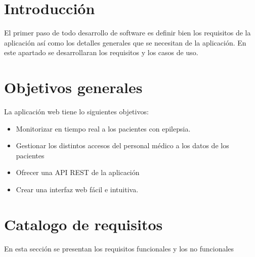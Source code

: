
\section{Introducción}

El primer paso de todo desarrollo de software es definir bien los requisitos de la aplicación así como los detalles generales que se necesitan de la aplicación. En este apartado se desarrollaran los requisitos y los casos de uso.

\section{Objetivos generales}

La aplicación web tiene lo siguientes objetivos:
\begin{itemize}
	\tightlist
	\item
	Monitorizar en tiempo real a los pacientes con epilepsia.
	\item 
	Gestionar los distintos accesos del personal médico a los datos de los pacientes
	\item 
	Ofrecer una API REST de la aplicación
	\item 
	Crear una interfaz web fácil e intuitiva.
\end{itemize}

\section{Catalogo de requisitos}
En esta sección se presentan los requisitos funcionales y los no funcionales
